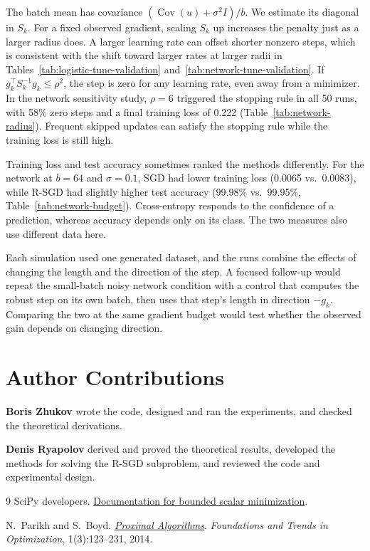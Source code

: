 \documentclass[11pt,a4paper]{article}
\begin{document}
The batch mean has covariance $(\operatorname{Cov}(u)+\sigma^2 I)/b$.
We estimate its diagonal in $S_k$. For a fixed observed gradient,
scaling $S_k$ up increases the penalty just as a larger radius does.
A larger learning rate can offset shorter nonzero
steps, which is consistent with the shift toward larger rates at
larger radii in Tables~\ref{tab:logistic-tune-validation}
and~\ref{tab:network-tune-validation}. If
$g_k^\top S_k^{-1}g_k\leq\rho^2$, the step is zero for any learning
rate, even away from a minimizer. In the network sensitivity study,
$\rho=6$ triggered the stopping rule in all 50 runs, with 58\% zero
steps and a final training loss of 0.222
(Table~\ref{tab:network-radius}). Frequent skipped updates can
satisfy the stopping rule while the training loss is still high.

Training loss and test accuracy sometimes ranked the methods
differently. For the network at $b=64$ and $\sigma=0.1$, SGD had
lower training loss (0.0065 vs.\ 0.0083), while R-SGD had slightly
higher test accuracy (99.98\% vs.\ 99.95\%,
Table~\ref{tab:network-budget}). Cross-entropy responds
to the confidence of a prediction, whereas accuracy depends only
on its class. The two measures also use different data here.

Each simulation used one generated dataset, and the runs combine
the effects of changing the length and the direction of the step.
A focused follow-up would repeat the small-batch noisy network
condition with a control that computes the robust step on its own
batch, then uses that step's length in direction $-g_k$. Comparing
the two at the same gradient budget would test whether the observed
gain depends on changing direction.

\section*{Author Contributions}

\noindent\textbf{Boris Zhukov} wrote the code, designed and ran the
experiments, and checked the theoretical derivations.

\noindent\textbf{Denis Ryapolov} derived and proved the theoretical
results, developed the methods for solving the R-SGD subproblem,
and reviewed the code and experimental design.

\begin{thebibliography}{9}
SciPy developers.
\href{https://docs.scipy.org/doc/scipy/reference/generated/scipy.optimize.minimize_scalar.html}
     {Documentation for bounded scalar minimization}.

N.~Parikh and S.~Boyd.
\href{https://web.stanford.edu/~boyd/papers/pdf/prox_algs.pdf}
     {\emph{Proximal Algorithms}}.
\emph{Foundations and Trends in Optimization}, 1(3):123--231, 2014.
\end{thebibliography}
\end{document}
